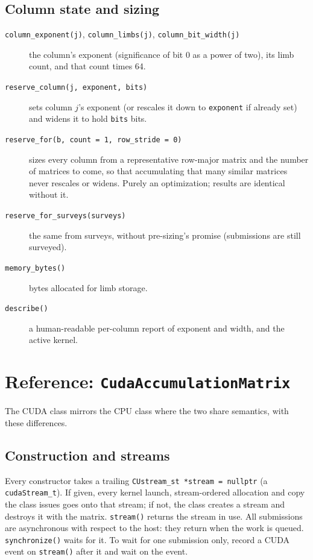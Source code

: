 \documentclass[11pt]{article}
\newcommand{\code}[1]{\texttt{#1}}
\begin{document}
\subsection{Column state and sizing}
\begin{description}
\item[\code{column\_exponent(j)}, \code{column\_limbs(j)}, \code{column\_bit\_width(j)}] the column's exponent (significance of bit 0 as a power of two), its limb count, and that count times 64.
\item[\code{reserve\_column(j, exponent, bits)}] sets column $j$'s exponent (or rescales it down to \code{exponent} if already set) and widens it to hold \code{bits} bits.
\item[\code{reserve\_for(b, count = 1, row\_stride = 0)}] sizes every column from a representative row-major matrix and the number of matrices to come, so that accumulating that many similar matrices never rescales or widens. Purely an optimization; results are identical without it.
\item[\code{reserve\_for\_surveys(surveys)}] the same from surveys, without pre-sizing's promise (submissions are still surveyed).
\item[\code{memory\_bytes()}] bytes allocated for limb storage.
\item[\code{describe()}] a human-readable per-column report of exponent and width, and the active kernel.
\end{description}

\section{Reference: \code{CudaAccumulationMatrix}}

The CUDA class mirrors the CPU class where the two share semantics, with these differences.

\subsection{Construction and streams}
Every constructor takes a trailing \code{CUstream\_st *stream = nullptr} (a \code{cudaStream\_t}). If given, every kernel launch, stream-ordered allocation and copy the class issues goes onto that stream; if not, the class creates a stream and destroys it with the matrix. \code{stream()} returns the stream in use. All submissions are asynchronous with respect to the host: they return when the work is queued. \code{synchronize()} waits for it. To wait for one submission only, record a CUDA event on \code{stream()} after it and wait on the event.
\end{document}
